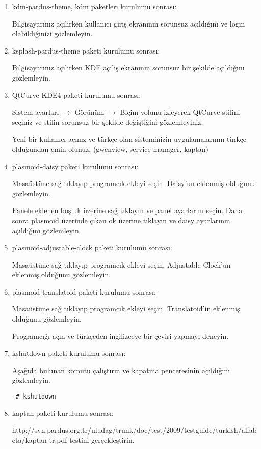 \documentclass[a4paper,10pt]{article}
\begin{document}
\begin{enumerate}

\item  kdm-pardus-theme, kdm paketleri kurulumu sonrası:

Bilgisayarınız açılırken kullanıcı giriş ekranının sorunsuz açıldığını ve login olabildiğinizi gözlemleyin.

\item  ksplash-pardus-theme paketi kurulumu sonrası:

Bilgisayarınız açılırken KDE açılış ekranının sorunsuz bir şekilde açıldığını gözlemleyin.

 \item  QtCurve-KDE4 paketi kurulumu sonrası:

Sistem ayarları $\rightarrow$ Görünüm $\rightarrow$ Biçim yolunu izleyerek QtCurve stilini seçiniz ve stilin sorunsuz bir şekilde değiştiğini gözlemleyiniz.

Yeni bir kullanıcı açınız ve türkçe olan sisteminizin uygulamalarının türkçe olduğundan emin olunuz. (gwenview, service manager, kaptan)

\item plasmoid-daisy paketi kurulumu sonrası:

Masaüstüne sağ tıklayıp programcık ekleyi seçin. Daisy'un eklenmiş olduğunu gözlemleyin.

Panele eklenen boşluk üzerine sağ tıklayın ve panel ayarlarını seçin. Daha sonra plasmoid üzerinde çıkan ok üzerine tıklayın ve daisy ayarlarının açıldığını gözlemleyin.

 \item plasmoid-adjustable-clock paketi kurulumu sonrası:

Masaüstüne sağ tıklayıp programcık ekleyi seçin. Adjustable Clock'un eklenmiş olduğunu gözlemleyin.


 \item plasmoid-translatoid paketi kurulumu sonrası:

Masaüstüne sağ tıklayıp programcık ekleyi seçin. Translatoid'in eklenmiş olduğunu gözlemleyin.

Programcığı açın ve türkçeden ingilizceye bir çeviri yapmayı deneyin.
 \item kshutdown paketi kurulumu sonrası:

Aşağıda bulunan komutu çalıştırın ve kapatma penceresinin açıldığını gözlemleyin.
\begin{verbatim}
 # kshutdown 
\end{verbatim}

 \item kaptan paketi kurulumu sonrası:

  http://svn.pardus.org.tr/uludag/trunk/doc/test/2009/testguide/turkish/alfabeta/kaptan-tr.pdf testini gerçekleştirin.

\end{enumerate}
\end{document}
